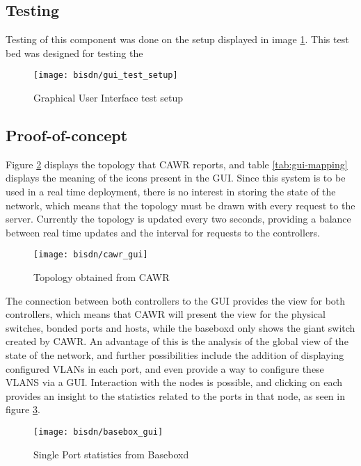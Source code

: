 \subsection{Testing}

\par Testing of this component was done on the setup displayed in image \ref{fig:gui_test_setup}. This test bed was designed for testing the 

\begin{figure}[H]
    \centering
    \texttt{[image: bisdn/gui\_test\_setup]}
    \caption{Graphical User Interface test setup}
    \label{fig:gui_test_setup}
\end{figure}


\subsection{Proof-of-concept}

\par Figure \ref{fig:cawr_gui} displays the topology that CAWR reports, and table \ref{tab:gui-mapping} displays the meaning of the icons present in the GUI. Since 
this system is to be used in a real time deployment, there is no interest in storing the state of the network, which means that the topology must be drawn with 
every request to the server. Currently the topology is updated every two seconds, providing a balance between real time updates and the interval for requests to the
controllers.

\begin{figure} [H]
        \centering
        \texttt{[image: bisdn/cawr\_gui]}
        \caption{Topology obtained from CAWR}
        \label{fig:cawr_gui}
\end{figure}

\par The connection between both controllers to the GUI provides the view for both controllers, which means that CAWR will present the view for the physical
switches, bonded ports and hosts, while the baseboxd only shows the giant switch created by CAWR. An advantage of this is the analysis of the global view of the
state of the network, and further possibilities include the addition of displaying configured VLANs in each port, and even provide a way to configure these VLANS
via a GUI. Interaction with the nodes is possible, and clicking on each provides an insight to the statistics related to the ports in that node, as seen in figure
\ref{fig:basebox_stats}.

\begin{figure}
    \centering
    \texttt{[image: bisdn/basebox\_gui]}
    \caption{Single Port statistics from Baseboxd}
    \label{fig:basebox_stats}
\end{figure}
